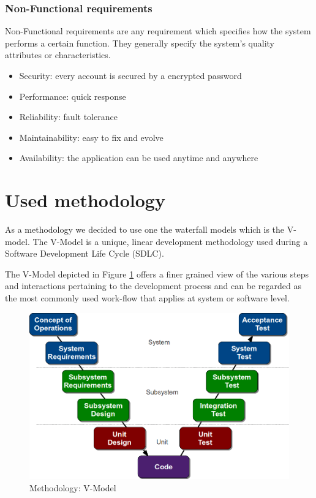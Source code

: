 \documentclass[12pt,a4paper]{report}
\begin{document}
\begin{itemize}
\begin{itemize}
			
		\end{itemize}
	\end{itemize}
	
	\subsubsection{Non-Functional requirements}
	Non-Functional requirements are any requirement which specifies how the system performs a certain function. They generally specify the system’s quality attributes or characteristics.
	\begin{itemize}
		\item Security: every account is secured by a encrypted password 
		\item Performance: quick response
		\item Reliability: fault tolerance
		\item Maintainability: easy to fix and evolve
		\item Availability: the application can be used anytime and anywhere
		
	\end{itemize}
	\section{Used methodology}
	
	As a methodology we decided to use one the waterfall models which is the V-model.
	The V-Model is a unique, linear development methodology used during a Software Development Life Cycle (SDLC).\par 
	The V-Model depicted in Figure \ref{label-vmodel} offers a finer grained view of the various steps and interactions pertaining to the development process and can be regarded as the most commonly used work-flow that applies at system or software level.\\
	
	\begin{figure}[H]
		\centering
		\includegraphics[width=5in,keepaspectratio]{Vmodel.png}
		\caption{Methodology: V-Model\protect{}\protect\footnotemark[\thefootnote]}
		
		\label{label-vmodel}
	\end{figure}
\end{document}
